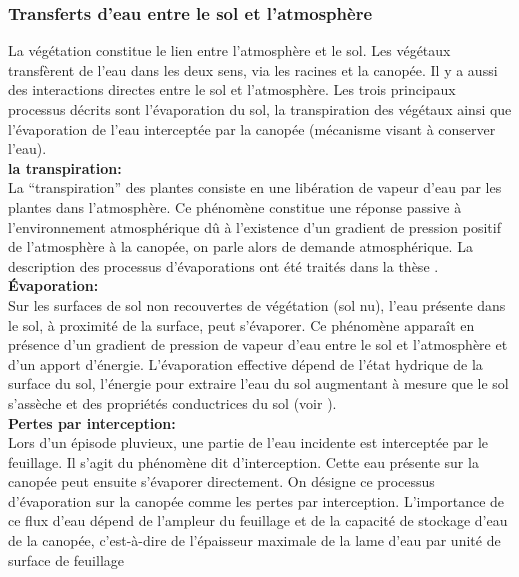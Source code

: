 \documentclass[a4paper,10pt]{article}
\begin{document}
\subsubsection{Transferts d'eau entre le sol et l'atmosphère}

La végétation constitue le lien entre l'atmosphère et le sol. Les végétaux transfèrent de l'eau dans les deux sens, via les racines et la canopée. Il y a aussi des interactions directes entre le sol et l'atmosphère. Les trois principaux processus décrits sont l'évaporation du sol, la transpiration des végétaux ainsi que l'évaporation de l'eau interceptée par la canopée (mécanisme visant à conserver l'eau).\\

\textbf{la transpiration:}\\

La ``transpiration'' des plantes consiste en une libération de vapeur d’eau par les plantes dans l’atmosphère. Ce phénomène constitue une réponse passive à l’environnement atmosphérique dû à l’existence d’un gradient de pression positif de l’atmosphère à la canopée, on parle alors de demande atmosphérique. La description des processus d'évaporations ont été traités dans la thèse \cite{maquin2016developpement}.\\

\textbf{Évaporation:}\\

Sur les surfaces de sol non recouvertes de végétation (sol nu), l’eau présente dans le sol, à proximité de la surface, peut s’évaporer. Ce phénomène apparaît en présence d’un gradient de pression de vapeur d’eau entre le sol et l’atmosphère et d’un apport d’énergie. L’évaporation effective dépend de l’état hydrique de la surface du sol, l’énergie pour extraire l’eau du sol augmentant à mesure que le sol s’assèche et des propriétés conductrices du sol (voir \cite{hillel2003introduction}). \\

\textbf{Pertes par interception:}\\

Lors d’un épisode pluvieux, une partie de l’eau incidente est interceptée par le feuillage. Il s’agit du phénomène dit d’interception. Cette eau présente sur la canopée peut ensuite s’évaporer directement. On désigne ce processus d’évaporation sur la canopée comme les pertes par interception. L’importance de ce flux d’eau dépend de l’ampleur du feuillage et de la capacité de stockage d’eau de la canopée, c’est-à-dire de l’épaisseur maximale de la lame d’eau par unité de surface de feuillage\\
\end{document}
